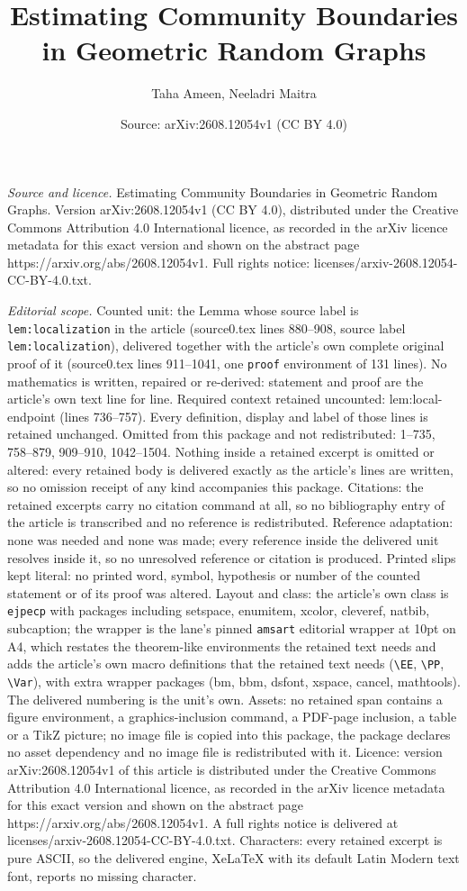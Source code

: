 \documentclass[10pt,a4paper]{amsart}
\title[Estimating Community Boundaries in Geometric Random Graphs]{Estimating Community Boundaries in Geometric Random Graphs}
\author{Taha Ameen, Neeladri Maitra}
\date{Source: arXiv:2608.12054v1 (CC BY 4.0)}
\begin{document}
\maketitle

\noindent\emph{Source and licence.} Estimating Community Boundaries in Geometric Random Graphs. Version arXiv:2608.12054v1 (CC BY 4.0), distributed under the Creative Commons Attribution 4.0 International licence, as recorded in the arXiv licence metadata for this exact version and shown on the abstract page https://arxiv.org/abs/2608.12054v1. Full rights notice: licenses/arxiv-2608.12054-CC-BY-4.0.txt.\par\smallskip

\noindent\textit{Editorial scope.} Counted unit: the Lemma whose source label is \texttt{lem:localization} in the article (source0.tex lines 880--908, source label \texttt{lem:localization}), delivered together with the article's own complete original proof of it (source0.tex lines 911--1041, one \texttt{proof} environment of 131 lines). No mathematics is written, repaired or re-derived: statement and proof are the article's own text line for line. Required context retained uncounted: lem:local-endpoint (lines 736--757). Every definition, display and label of those lines is retained unchanged. Omitted from this package and not redistributed: 1--735, 758--879, 909--910, 1042--1504. Nothing inside a retained excerpt is omitted or altered: every retained body is delivered exactly as the article's lines are written, so no omission receipt of any kind accompanies this package. Citations: the retained excerpts carry no citation command at all, so no bibliography entry of the article is transcribed and no reference is redistributed. Reference adaptation: none was needed and none was made; every reference inside the delivered unit resolves inside it, so no unresolved reference or citation is produced. Printed slips kept literal: no printed word, symbol, hypothesis or number of the counted statement or of its proof was altered. Layout and class: the article's own class is \texttt{ejpecp} with packages including setspace, enumitem, xcolor, cleveref, natbib, subcaption; the wrapper is the lane's pinned \texttt{amsart} editorial wrapper at 10pt on A4, which restates the theorem-like environments the retained text needs and adds the article's own macro definitions that the retained text needs (\texttt{\textbackslash EE}, \texttt{\textbackslash PP}, \texttt{\textbackslash Var}), with extra wrapper packages (bm, bbm, dsfont, xspace, cancel, mathtools). The delivered numbering is the unit's own. Assets: no retained span contains a figure environment, a graphics-inclusion command, a PDF-page inclusion, a table or a TikZ picture; no image file is copied into this package, the package declares no asset dependency and no image file is redistributed with it. Licence: version arXiv:2608.12054v1 of this article is distributed under the Creative Commons Attribution 4.0 International licence, as recorded in the arXiv licence metadata for this exact version and shown on the abstract page https://arxiv.org/abs/2608.12054v1. A full rights notice is delivered at licenses/arxiv-2608.12054-CC-BY-4.0.txt. Characters: every retained excerpt is pure ASCII, so the delivered engine, XeLaTeX with its default Latin Modern text font, reports no missing character.
\end{document}
